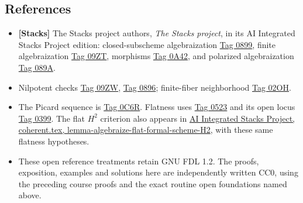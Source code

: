 \documentclass[11pt]{article}
\providecommand{\tightlist}{\setlength{\itemsep}{0pt}\setlength{\parskip}{0pt}}
\begin{document}
\subsection{References}\label{references-5}

\begin{itemize}
\tightlist
\item
  \textbf{{[}Stacks{]}} The Stacks project authors, \emph{The Stacks
  project}, in its AI Integrated Stacks Project edition:
  closed-subscheme algebraization
  \href{https://kokunoyumeto.github.io/stacks-zh-hans-cn/en/coherent.html\#coherent-lemma-algebraize-formal-closed-subscheme}{Tag
  0899}, finite algebraization
  \href{https://kokunoyumeto.github.io/stacks-zh-hans-cn/en/coherent.html\#coherent-lemma-algebraize-formal-scheme-finite-over-proper}{Tag
  09ZT}, morphisms
  \href{https://kokunoyumeto.github.io/stacks-zh-hans-cn/en/coherent.html\#coherent-lemma-algebraize-morphism}{Tag
  0A42}, and polarized algebraization
  \href{https://kokunoyumeto.github.io/stacks-zh-hans-cn/en/coherent.html\#coherent-theorem-algebraization}{Tag
  089A}.
\item
  Nilpotent checks
  \href{https://kokunoyumeto.github.io/stacks-zh-hans-cn/en/more-morphisms.html\#more-morphisms-lemma-thicken-property-morphisms-cartesian}{Tag
  09ZW},
  \href{https://kokunoyumeto.github.io/stacks-zh-hans-cn/en/morphisms.html\#morphisms-lemma-check-closed-infinitesimally}{Tag
  0896}; finite-fiber neighborhood
  \href{https://kokunoyumeto.github.io/stacks-zh-hans-cn/en/coherent.html\#coherent-lemma-proper-finite-fibre-finite-in-neighbourhood}{Tag
  02OH}.
\item
  The Picard sequence is
  \href{https://kokunoyumeto.github.io/stacks-zh-hans-cn/en/more-morphisms.html\#more-morphisms-lemma-picard-group-first-order-thickening}{Tag
  0C6R}. Flatness uses
  \href{https://kokunoyumeto.github.io/stacks-zh-hans-cn/en/algebra.html\#algebra-lemma-flat-module-powers}{Tag
  0523} and its open locus
  \href{https://kokunoyumeto.github.io/stacks-zh-hans-cn/en/more-morphisms.html\#more-morphisms-theorem-openness-flatness}{Tag
  0399}. The flat \(H^2\) criterion also appears in
  \href{https://kokunoyumeto.github.io/stacks-zh-hans-cn/en/coherent.html\#coherent-lemma-algebraize-flat-formal-scheme-H2}{AI
  Integrated Stacks Project, coherent.tex,
  lemma-algebraize-flat-formal-scheme-H2}, with these same flatness
  hypotheses.
\item
  These open reference treatments retain GNU FDL 1.2. The proofs,
  exposition, examples and solutions here are independently written CC0,
  using the preceding course proofs and the exact routine open
  foundations named above.
\end{itemize}
\end{document}

